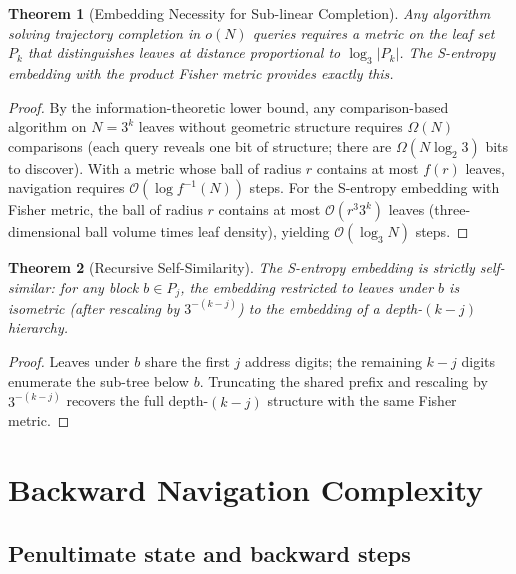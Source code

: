 \documentclass[twocolumn,10pt,a4paper]{article}
\theoremstyle{thmstyle}
\newtheorem{theorem}{Theorem}[section]
\theoremstyle{definition}
\theoremstyle{remark}
\begin{document}
\begin{theorem}[Embedding Necessity for Sub-linear Completion]
\label{thm:embedding_necessity}
Any algorithm solving trajectory completion in $o(N)$ queries requires
a metric on the leaf set $P_k$ that distinguishes leaves at distance
proportional to $\log_3|P_k|$. The S-entropy embedding with the product
Fisher metric provides exactly this.
\end{theorem}

\begin{proof}
By the information-theoretic lower bound, any comparison-based
algorithm on $N = 3^k$ leaves without geometric structure requires
$\Omega(N)$ comparisons (each query reveals one bit of structure;
there are $\Omega(N \log_2 3)$ bits to discover). With a metric whose
ball of radius $r$ contains at most $f(r)$ leaves, navigation requires
$\mathcal{O}(\log f^{-1}(N))$ steps. For the S-entropy embedding with
Fisher metric, the ball of radius $r$ contains at most $\mathcal{O}(r^3 3^k)$
leaves (three-dimensional ball volume times leaf density), yielding
$\mathcal{O}(\log_3 N)$ steps.
\end{proof}

\begin{theorem}[Recursive Self-Similarity]
\label{thm:self_similar}
The S-entropy embedding is strictly self-similar: for any block $b \in P_j$,
the embedding restricted to leaves under $b$ is isometric (after rescaling
by $3^{-(k-j)}$) to the embedding of a depth-$(k-j)$ hierarchy.
\end{theorem}

\begin{proof}
Leaves under $b$ share the first $j$ address digits; the remaining
$k-j$ digits enumerate the sub-tree below $b$. Truncating the shared
prefix and rescaling by $3^{-(k-j)}$ recovers the full depth-$(k-j)$ structure
with the same Fisher metric.
\end{proof}

\section{Backward Navigation Complexity}
\label{sec:backward}

\subsection{Penultimate state and backward steps}
\end{document}
